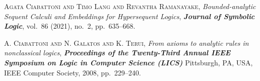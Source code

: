 \documentclass[bsl,meeting]{asl}
\begin{document}
\begin{thebibliography}{10}


{\scshape Agata Ciabattoni and
               Timo Lang and
               Revantha Ramanayake},
{\itshape Bounded-analytic Sequent Calculi and Embeddings for Hypersequent Logics},
{\bfseries\itshape Journal of Symbolic Logic},
vol.~86 (2021), no.~2, pp.~635--668.

{\scshape A. Ciabattoni and N. Galatos and K. Terui},
{\itshape From axioms to analytic rules in nonclassical logics},
{\bfseries\itshape Proceedings of the Twenty-Third Annual {IEEE} Symposium on Logic in
               Computer Science (LICS)}
Pittsburgh, PA, {USA},
{IEEE} Computer Society,
2008,
pp.~229--240.

\end{thebibliography}
\end{document}
